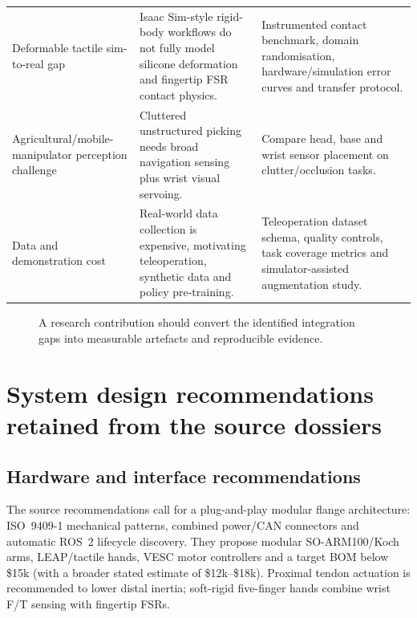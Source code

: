 \documentclass[10pt,a4paper]{article}
\begin{document}
\begin{longtable}{@{}p{}p{}p{}@{}}
Deformable tactile sim-to-real gap & Isaac Sim-style rigid-body workflows do not fully model silicone deformation and fingertip FSR contact physics. & Instrumented contact benchmark, domain randomisation, hardware/simulation error curves and transfer protocol. \\
Agricultural/mobile-manipulator perception challenge & Cluttered unstructured picking needs broad navigation sensing plus wrist visual servoing. & Compare head, base and wrist sensor placement on clutter/occlusion tasks. \\
Data and demonstration cost & Real-world data collection is expensive, motivating teleoperation, synthetic data and policy pre-training. & Teleoperation dataset schema, quality controls, task coverage metrics and simulator-assisted augmentation study. \\
\bottomrule
\end{longtable}

\begin{figure}[ht]
\centering
{}
\caption{A research contribution should convert the identified integration gaps into measurable artefacts and reproducible evidence.}
\end{figure}

\section{System design recommendations retained from the source dossiers}
\subsection{Hardware and interface recommendations}
The source recommendations call for a plug-and-play modular flange architecture: ISO~9409-1 mechanical patterns, combined power/CAN connectors and automatic ROS~2 lifecycle discovery. They propose modular SO-ARM100/Koch arms, LEAP/tactile hands, VESC motor controllers and a target BOM below \$15k (with a broader stated estimate of \$12k--\$18k). Proximal tendon actuation is recommended to lower distal inertia; soft-rigid five-finger hands combine wrist F/T sensing with fingertip FSRs.
\end{document}
